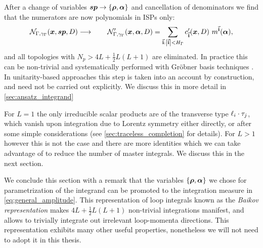 After a change of variables $\vb*{sp}\to \{\vb*{\rho},\vb*{\alpha}\}$ and cancellation of denominators
we find that the numerators are now polynomials in ISPs only:
\begin{equation}
  \label{eq:rsp_reduction}
  \mathcal{N}_{\Gamma,\gamma_\Gamma}(\vb*{x}, \vb*{sp}, D) \longrightarrow \qquad
    \mathcal{N}^{\prime}_{\Gamma,\gamma_\Gamma}(\vb*{x}, \vb*{\alpha}, D) =
    \sum_{\va{i} : \abs{\va{i}} < H_{\Gamma}} c^{\prime}_{\va{i}} (\vb*{x},D)~ m^{\va{i}}(\vb*{\alpha}),
\end{equation}
and all topologies with $N_p > 4L +\frac{1}{2}L(L+1)$ are eliminated.
In practice this can be non-trivial and systematically performed with Gröbner basis techniques \cite{Zhang:2012ce,Mastrolia:2012wf,Mastrolia:2012an,Mastrolia:2016dhn}.
In unitarity-based approaches this step is taken into an account by construction,
and need not be carried out explicitly. We discuss this in more detail in \cref{sec:ansatz_integrand}

For $L=1$ the only irreducible scalar products are of the transverse type $\sp(\ell_i, \tau_j)$, which vanish upon integration due to Lorentz symmetry either directly,
or after some simple considerations (see \cref{sec:traceless_completion} for details).
For $L>1$ however this is not the case and there are more identities which we can take advantage of to reduce the number of master integrals.
We discuss this in the next section.


We conclude this section with a remark that the variables $\{\vb*{\rho},\vb*{\alpha}\}$ we chose for parametrization of the integrand can be promoted
to the integration measure in \cref{eq:general_amplitude}. This representation of loop integrals known as the \emph{Baikov representation} \cite{Baikov:1996rk} 
makes $4 L +\frac{1}{2}L(L+1)$ non-trivial integrations manifest, and allows to trivially integrate out irrelevant loop-momenta directions. This representation
exhibits many other useful properties, nonetheless we will not need to adopt it in this thesis.


